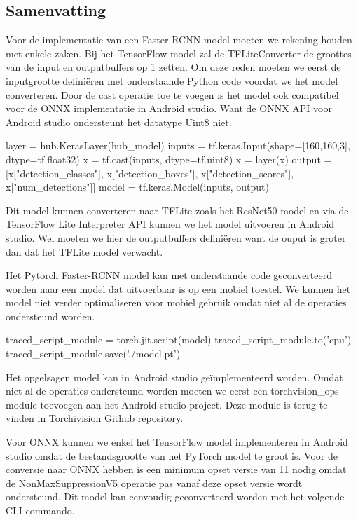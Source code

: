 \subsection{Samenvatting}
Voor de implementatie van een Faster-RCNN model moeten we rekening houden met enkele zaken.
Bij het TensorFlow model zal de TFLiteConverter de groottes van de input en outputbuffers op 1 zetten.
Om deze reden moeten we eerst de inputgrootte defini\"eren met onderstaande Python code voordat we het model converteren.
Door de cast operatie toe te voegen is het model ook compatibel voor de ONNX implementatie in Android studio.
Want de ONNX API voor Android studio ondersteunt het datatype Uint8 niet.

\begin{python}
layer = hub.KerasLayer(hub_model) 
inputs = tf.keras.Input(shape=[160,160,3], dtype=tf.float32)
x = tf.cast(inputs, dtype=tf.uint8)
x = layer(x) 
output = [x["detection_classes"], x["detection_boxes"], x["detection_scores"], x["num_detections"]]
model = tf.keras.Model(inputs, output) 
\end{python}

Dit model kunnen converteren naar TFLite zoals het ResNet50 model en via de TensorFlow Lite Interpreter API kunnen we het model uitvoeren in Android studio.
Wel moeten we hier de outputbuffers defini\"eren want de ouput is groter dan dat het TFLite model verwacht.

Het Pytorch Faster-RCNN model kan met onderstaande code geconverteerd worden naar een model dat uitvoerbaar is op een mobiel toestel.
We kunnen het model niet verder optimaliseren voor mobiel gebruik omdat niet al de operaties ondersteund worden.

\begin{python}
traced_script_module = torch.jit.script(model)
traced_script_module.to('cpu') 
traced_script_module.save('./model.pt') 
\end{python}

Het opgelsagen model kan in Android studio ge\"implementeerd worden.
Omdat niet al de operaties ondersteund worden moeten we eerst een torchvision\_ops module toevoegen aan het Android studio project.
Deze module is terug te vinden in Torchivision Github repository.

Voor ONNX kunnen we enkel het TensorFlow model implementeren in Android studio omdat de bestandsgrootte van het PyTorch model te groot is.
Voor de conversie naar ONNX hebben is een minimum opset versie van 11 nodig omdat de NonMaxSuppressionV5 operatie pas vanaf deze opset versie wordt ondersteund.
Dit model kan eenvoudig geconverteerd worden met het volgende CLI-commando.

